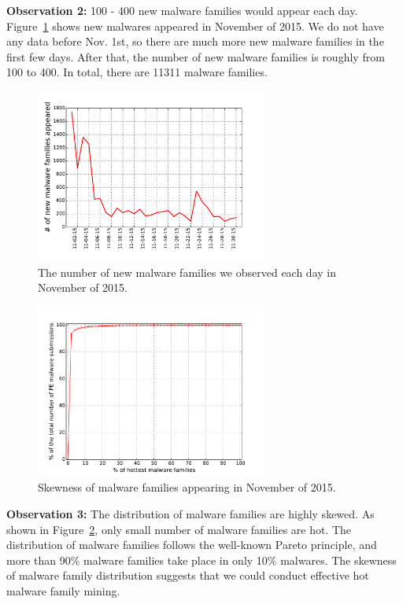 {\bf Observation 2:} 
100 - 400 new malware families would appear each day. 
Figure~\ref{fig:new} shows new malwares appeared in November of 2015. 
We do not have any data before Nov. 1st, 
so there are much more new malware families in the first few days.
After that, the number of new malware families is roughly from 100 to 400. 
In total, there are 11311 malware families. 




\begin{figure}[t!]
\begin{center}
\includegraphics[width=3.0in]{figure/new_family}
\caption{The number of new malware families we observed each day in November of 2015.}
\label{fig:new}
\end{center}
\end{figure}

\begin{figure}[t!]
\begin{center}
\includegraphics[width=3.0in]{figure/cum}
\caption{Skewness of malware families appearing in November of 2015.}
\label{fig:acum}
\end{center}
\end{figure}

{\bf Observation 3:} 
The distribution of malware families are highly skewed. 
As shown in Figure~\ref{fig:acum}, only small number of malware families are hot.
The distribution of malware families follows the well-known Pareto principle, 
and more than 90\% malware families take place in only 10\% malwares. 
The skewness of malware family distribution suggests that we could conduct effective hot malware family mining. 